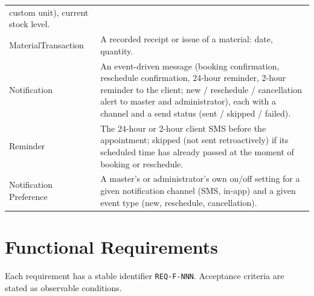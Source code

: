 \documentclass[11pt,a4paper]{article}
\begin{document}
\begin{longtable}{L{3.4cm}L{10.6cm}}
  custom unit), current stock level. \\
MaterialTransaction & A recorded receipt or issue of a material: date,
  quantity. \\
Notification & An event-driven message (booking confirmation, reschedule
  confirmation, 24-hour reminder, 2-hour reminder to the client; new /
  reschedule / cancellation alert to master and administrator), each with a
  channel and a send status (sent / skipped / failed). \\
Reminder & The 24-hour or 2-hour client SMS before the appointment; skipped
  (not sent retroactively) if its scheduled time has already passed at the
  moment of booking or reschedule. \\
Notification Preference & A master's or administrator's own on/off setting
  for a given notification channel (SMS, in-app) and a given event type
  (new, reschedule, cancellation). \\
\bottomrule
\end{longtable}

\section{Functional Requirements}
\label{sec:functional}

Each requirement has a stable identifier \texttt{REQ-F-NNN}. Acceptance
criteria are stated as observable conditions.
\end{document}
